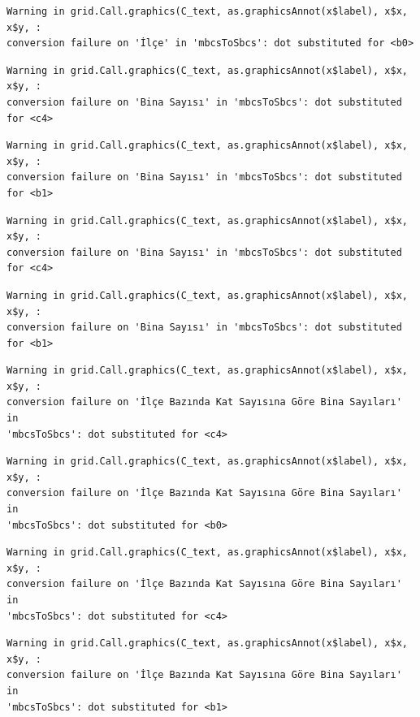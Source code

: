\documentclass[
  11pt,
  a4paper,
  DIV=11,
  numbers=noendperiod]{scrartcl}
\begin{document}
\begin{verbatim}
Warning in grid.Call.graphics(C_text, as.graphicsAnnot(x$label), x$x, x$y, :
conversion failure on 'İlçe' in 'mbcsToSbcs': dot substituted for <b0>
\end{verbatim}

\begin{verbatim}
Warning in grid.Call.graphics(C_text, as.graphicsAnnot(x$label), x$x, x$y, :
conversion failure on 'Bina Sayısı' in 'mbcsToSbcs': dot substituted for <c4>
\end{verbatim}

\begin{verbatim}
Warning in grid.Call.graphics(C_text, as.graphicsAnnot(x$label), x$x, x$y, :
conversion failure on 'Bina Sayısı' in 'mbcsToSbcs': dot substituted for <b1>
\end{verbatim}

\begin{verbatim}
Warning in grid.Call.graphics(C_text, as.graphicsAnnot(x$label), x$x, x$y, :
conversion failure on 'Bina Sayısı' in 'mbcsToSbcs': dot substituted for <c4>
\end{verbatim}

\begin{verbatim}
Warning in grid.Call.graphics(C_text, as.graphicsAnnot(x$label), x$x, x$y, :
conversion failure on 'Bina Sayısı' in 'mbcsToSbcs': dot substituted for <b1>
\end{verbatim}

\begin{verbatim}
Warning in grid.Call.graphics(C_text, as.graphicsAnnot(x$label), x$x, x$y, :
conversion failure on 'İlçe Bazında Kat Sayısına Göre Bina Sayıları' in
'mbcsToSbcs': dot substituted for <c4>
\end{verbatim}

\begin{verbatim}
Warning in grid.Call.graphics(C_text, as.graphicsAnnot(x$label), x$x, x$y, :
conversion failure on 'İlçe Bazında Kat Sayısına Göre Bina Sayıları' in
'mbcsToSbcs': dot substituted for <b0>
\end{verbatim}

\begin{verbatim}
Warning in grid.Call.graphics(C_text, as.graphicsAnnot(x$label), x$x, x$y, :
conversion failure on 'İlçe Bazında Kat Sayısına Göre Bina Sayıları' in
'mbcsToSbcs': dot substituted for <c4>
\end{verbatim}

\begin{verbatim}
Warning in grid.Call.graphics(C_text, as.graphicsAnnot(x$label), x$x, x$y, :
conversion failure on 'İlçe Bazında Kat Sayısına Göre Bina Sayıları' in
'mbcsToSbcs': dot substituted for <b1>
\end{verbatim}
\end{document}
